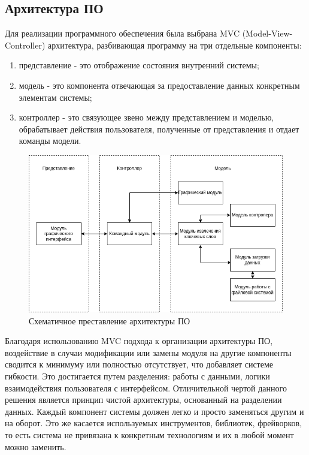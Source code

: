 \subsection{Архитектура ПО}
Для реализации программного обеспечения была выбрана MVC (Model-View-Controller) архитектура, разбивающая программу на три отдельные компоненты:
\begin{enumerate}
	\item представление - это отображение состояния внутренний системы;
	\item модель - это компонента отвечающая за предоставление данных конкретным элементам системы;
	\item контроллер - это связующее звено между представлением и моделью, обрабатывает действия пользователя, полученные от представления и отдает команды модели.
\end{enumerate}
\begin{figure}[!h]
	\centering
	\includegraphics[width=1\linewidth]{src/img/design/mvc.drawio}
	\caption{Схематичное преставление архитектуры ПО}
	\label{fig:mvc}
\end{figure}

Благодаря использованию MVC подхода к организации архитектуры ПО, воздействие в случаи модификации или замены модуля на другие компоненты сводится к минимуму или полностью отсутствует, что добавляет системе гибкости.
Это достигается путем разделения: работы с данными, логики взаимодействия пользователя с интерфейсом.
Отличительной чертой данного решения является принцип чистой архитектуры, основанный на разделении данных.
Каждый компонент системы должен легко и просто заменяться другим и на оборот.
Это же касается используемых инструментов, библиотек, фрейворков, то есть система не привязана к конкретным технологиям и их в любой момент можно заменить.

